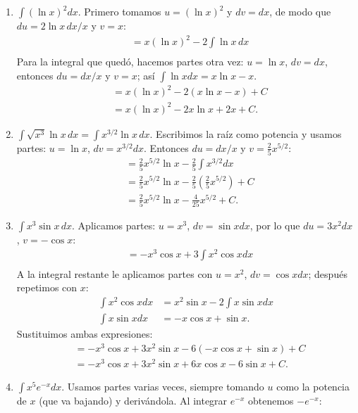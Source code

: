 \documentclass[12pt, letterpaper]{article}
\makeatletter
\renewcommand{\alph}[1]{\expandafter\@alphlatin\csname c@#1\endcsname}
\newcommand{\@alphlatin}[1]{\ifcase#1\or a\or b\or c\or d\or e\or f\or g\or h\or i\or j\or k\or l\or m\or n\or o\or p\or q\or r\or s\or t\or u\or v\or w\or x\or y\or z\else\@ctrerr\fi}
\makeatother
\begin{document}
\begin{enumerate}[label=\alph*)]
\[  \]
  \item $\displaystyle\int(\ln x)^2dx$. Primero tomamos $u=(\ln x)^2$ y $dv=dx$, de modo que $du=2\ln x\,dx/x$ y $v=x$:
  \[
  \begin{aligned}
  &=x(\ln x)^2-2\int\ln x\,dx\\
  \end{aligned}
  \]
  Para la integral que quedó, hacemos partes otra vez: $u=\ln x$, $dv=dx$, entonces $du=dx/x$ y $v=x$; así $\int\ln xdx=x\ln x-x$.
  \[
  \begin{aligned}
  &=x(\ln x)^2-2(x\ln x-x)+C\\
  &=\boxed{x(\ln x)^2-2x\ln x+2x+C}.
  \end{aligned}
  \]
  \item $\displaystyle\int\sqrt{x^3}\ln x\,dx=\int x^{3/2}\ln x\,dx$. Escribimos la raíz como potencia y usamos partes: $u=\ln x$, $dv=x^{3/2}dx$. Entonces $du=dx/x$ y $v=\frac25x^{5/2}$:
  \[
  \begin{aligned}
  &=\frac25x^{5/2}\ln x-\frac25\int x^{3/2}dx\\
  &=\frac25x^{5/2}\ln x-\frac25\left(\frac25x^{5/2}\right)+C\\
  &=\boxed{\frac25x^{5/2}\ln x-\frac4{25}x^{5/2}+C}.
  \end{aligned}
  \]
  \item $\displaystyle\int x^3\sin x\,dx$. Aplicamos partes: $u=x^3$, $dv=\sin xdx$, por lo que $du=3x^2dx$, $v=-\cos x$:
  \[
  \begin{aligned}
  &=-x^3\cos x+3\int x^2\cos xdx\\
  \end{aligned}
  \]
  A la integral restante le aplicamos partes con $u=x^2$, $dv=\cos xdx$; después repetimos con $x$:
  \[
  \begin{aligned}
  \int x^2\cos xdx&=x^2\sin x-2\int x\sin xdx\\
  \int x\sin xdx&=-x\cos x+\sin x.
  \end{aligned}
  \]
  Sustituimos ambas expresiones:
  \[
  \begin{aligned}
  &=-x^3\cos x+3x^2\sin x-6(-x\cos x+\sin x)+C\\
  &=\boxed{-x^3\cos x+3x^2\sin x+6x\cos x-6\sin x+C}.
  \end{aligned}
  \]
  \item $\displaystyle\int x^5e^{-x}dx$. Usamos partes varias veces, siempre tomando $u$ como la potencia de $x$ (que va bajando) y derivándola. Al integrar $e^{-x}$ obtenemos $-e^{-x}$:
  \[
  \begin{aligned}

\end{aligned}\]
\end{enumerate}
\end{document}
